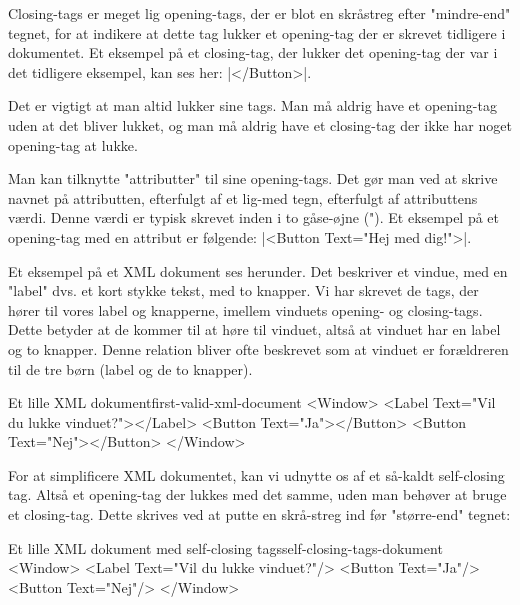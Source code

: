Closing-tags er meget lig opening-tags, der er blot en skråstreg efter "mindre-end" tegnet, for at indikere at dette tag lukker et opening-tag der er skrevet tidligere i dokumentet. Et eksempel på et closing-tag, der lukker det opening-tag der var i det tidligere eksempel, kan ses her: \XmlInline|</Button>|.

Det er vigtigt at man altid lukker sine tags. Man må aldrig have et opening-tag uden at det bliver lukket, og man må aldrig have et closing-tag der ikke har noget opening-tag at lukke.

Man kan tilknytte "attributter" til sine opening-tags. Det gør man ved at skrive navnet på attributten, efterfulgt af et lig-med tegn, efterfulgt af attributtens værdi. Denne værdi er typisk skrevet inden i to gåse-øjne ("). Et eksempel på et opening-tag med en attribut er følgende: \XmlInline|<Button Text="Hej med dig!">|.

Et eksempel på et XML dokument ses herunder. Det beskriver et vindue, med en "label" dvs. et kort stykke tekst, med to knapper. Vi har skrevet de tags, der hører til vores label og knapperne, imellem vinduets opening- og closing-tags. Dette betyder at de kommer til at høre til vinduet, altså at vinduet har en label og to knapper. Denne relation bliver ofte beskrevet som at vinduet er forældreren til de tre børn (label og de to knapper).

\begin{example}\noindent
	\begin{XmlCode}{Et lille XML dokument}{first-valid-xml-document}
		<Window>
			<Label Text="Vil du lukke vinduet?"></Label>
			<Button Text="Ja"></Button>
			<Button Text="Nej"></Button>
		</Window>
	\end{XmlCode}
\end{example}


For at simplificere XML dokumentet, kan vi udnytte os af et så-kaldt self-closing tag. Altså et opening-tag der lukkes med det samme, uden man behøver at bruge et closing-tag. Dette skrives ved at putte en skrå-streg ind før "større-end" tegnet:

\begin{example}\noindent
	\begin{XmlCode}{Et lille XML dokument med self-closing tags}{self-closing-tags-dokument}
		<Window>
			<Label Text="Vil du lukke vinduet?"/>
			<Button Text="Ja"/>
			<Button Text="Nej"/>
		</Window>
	\end{XmlCode}
\end{example}

